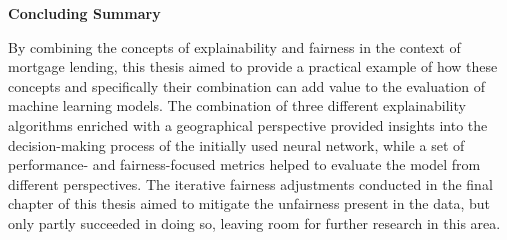 \pagebreak

\textbf{Concluding Summary}

By combining the concepts of explainability and fairness in the context of mortgage lending, this thesis aimed to provide a practical example of how these concepts and specifically their combination can add value to the evaluation of machine learning models.
The combination of three different explainability algorithms enriched with a geographical perspective provided insights into the decision-making process of the initially used neural network, while a set of performance- and fairness-focused metrics helped to evaluate the model from different perspectives.
The iterative fairness adjustments conducted in the final chapter of this thesis aimed to mitigate the unfairness present in the data, but only partly succeeded in doing so, leaving room for further research in this area.
